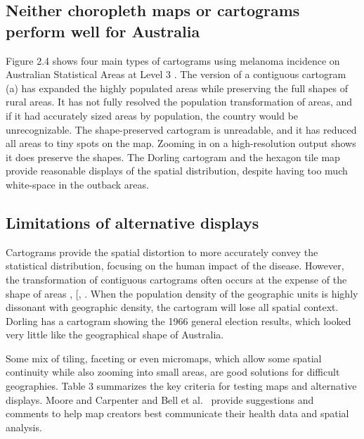 \documentclass{monashthesis}
\begin{document}
\hypertarget{neither-choropleth-maps-or-cartograms-perform-well-for-australia}{%
\subsection{Neither choropleth maps or cartograms perform well for Australia}\label{neither-choropleth-maps-or-cartograms-perform-well-for-australia}}

Figure 2.4 shows four main types of cartograms using melanoma incidence on Australian Statistical Areas at Level 3 \autocite{abs2016}. The version of a contiguous cartogram (a) has expanded the highly populated areas while preserving the full shapes of rural areas. It has not fully resolved the population transformation of areas, and if it had accurately sized areas by population, the country would be unrecognizable. The shape-preserved cartogram is unreadable, and it has reduced all areas to tiny spots on the map. Zooming in on a high-resolution output shows it does preserve the shapes. The Dorling cartogram and the hexagon tile map provide reasonable displays of the spatial distribution, despite having too much white-space in the outback areas.

\hypertarget{limitations-of-alternative-displays}{%
\subsection{Limitations of alternative displays}\label{limitations-of-alternative-displays}}

Cartograms provide the spatial distortion to more accurately convey the statistical distribution, focusing on the human impact of the disease. However, the transformation of contiguous cartograms often occurs at the expense of the shape of areas \autocite{CBATCC}, {[}\textcite{NAC}, \autocite{TAAM}. When the population density of the geographic units is highly dissonant with geographic density, the cartogram will lose all spatial context. Dorling \autocite{ACTUC} has a cartogram showing the 1966 general election results, which looked very little like the geographical shape of Australia.

Some mix of tiling, faceting or even micromaps, which allow some spatial continuity while also zooming into small areas, are good solutions for difficult geographies. Table 3 summarizes the key criteria for testing maps and alternative displays. Moore and Carpenter \autocite{SAMGIS} and Bell et al.~\autocite{CPISACA} provide suggestions and comments to help map creators best communicate their health data and spatial analysis.
\end{document}
